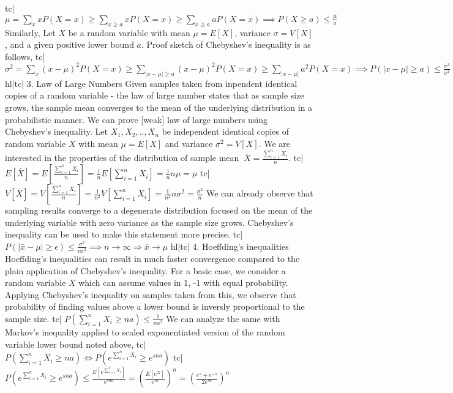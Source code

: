 tc| \( \mu = \sum_x xP(X=x) \ge \sum_{x\ge a}xP(X=x) \ge \sum_{x\ge a} aP(X=x) \implies P(X\ge a) \le \frac{\mu}{a} \)
Similarly, Let \(X\) be a random variable with mean \(\mu=E[X]\), variance \(\sigma=V[X]\), and a given positive lower bound \(a\). Proof sketch of Chebyshev's inequality is as follows,
tc| \( \sigma^2 = \sum_x (x - \mu)^2 P(X=x) \ge \sum_{|x-\mu| \ge a} (x - \mu)^2 P(X=x) \ge \sum_{|x-\mu|} a^2 P(X=x) \implies P(|x - \mu| \ge a) \le \frac{\sigma^2}{a^2} \)
hl|tc| 3. Law of Large Numbers
Given samples taken from inpendent identical copies of a random variable - the law of large number states that as sample size grows, the sample mean converges to the mean of the underlying distribution in a probabilistic manner. We can prove [weak] law of large numbers using Chebyshev's inequality.
Let \(X_1,X_2,..,X_n\) be independent identical copies of random variable \(X\) with mean \(\mu=E[X]\) and variance \(\sigma^2=V[X]\). We are interested in the properties of the distribution of sample mean \(\ \bar{X} = \frac{\sum_{i=1}^n X_i}{n} \).
tc| \( E[\bar{X}] = E \left[\frac{\sum_{i=1}^nX_i}{n} \right] = \frac{1}{n} E\left[\sum_{i=1}^n X_i \right] = \frac{1}{n} n\mu = \mu \)
tc| \( V[\bar{X}] = V\left[\frac{ \sum_{i=1}^n X_i}{n} \right] = \frac{1}{n^2} V\left[\sum_{i=1}^n X_i \right] = \frac{1}{n^2} n\sigma^2 = \frac{\sigma^2}{n} \)
We can already observe that sampling results converge to a degenerate distribution focused on the mean of the underlying variable with zero variance as the sample size grows. Chebyshev's inequality can be used to make this statement more precise.
tc| \( P(|\bar{x} -\mu| \ge \epsilon) \le \frac{\sigma^2}{n\epsilon^2} \implies n \rightarrow \infty \Rightarrow \bar{x} \rightarrow \mu \)
hl|tc| 4. Hoeffding's inequalities
Hoeffding's inequalities can result in much faster convergence compared to the plain application of Chebyshev's inequality. For a basic case, we consider a random variable \(X\) which can assume values in {1, -1} with equal probability. Applying Chebyshev's inequality on samples taken from this, we observe that probability of finding values above a lower bound is inversly proportional to the sample size.
tc| \( P(\sum_{i=1}^n X_i \ge na) \le \frac{1}{na^2} \)
We can analyze the same with Markov's inequality applied to scaled exponentiated version of the random variable lower bound noted above,
tc| \( P(\sum_{i=1}^n X_i \ge na) \iff P\left(e^{\sum_{i=1}^nX_i} \ge e^{sna}\right) \)
tc| \( P\left(e^{\sum_{i=1}^n X_i} \ge e^{sna} \right) \le \frac{E\left[e^{\sum_{i=1}^n X_i}\right]}{e^{sna}} = \left(\frac{E\left[ e^X \right]}{e^{sa}} \right)^n = \left( \frac{e^s + e^{-s}}{2e^{sa}} \right)^n \)
